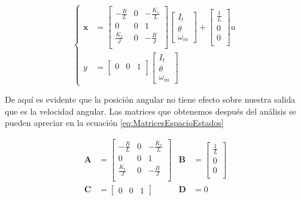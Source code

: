 \begin{equation}
  \begin{cases}
    \dot{\mathbf{x}}&=\begin{bmatrix}
     -\frac{R}{L}   & 0 & -\frac{K_e}{L} \\
      0             & 0 &   1            \\
      \frac{K_t}{J} & 0 & -\frac{B}{J}   \\
    \end{bmatrix}
    \begin{bmatrix}
      I_t\\ \theta\\ \omega_m
    \end{bmatrix}
    +\begin{bmatrix} 
      \frac{1}{L} \\
      0\\
      0\\
    \end{bmatrix} u\\
    y &= \begin{bmatrix}
      0 & 0 & 1\\
    \end{bmatrix}
    \begin{bmatrix}
      I_t\\ \theta\\ \omega_m
    \end{bmatrix}
  \end{cases}
\end{equation}

De aquí es evidente que la posición angular no tiene efecto sobre
nuestra salida que es la velocidad angular.
Las matrices que obtenemos después del análisis se pueden apreciar
en la ecuación \eqref{eq:MatricesEspacioEstados}

\begin{equation}
  \begin{aligned}
    \mathbf{A} &= \begin{bmatrix}
    -\frac{R}{L}  & 0 & -\frac{K_e}{L} \\
    0             & 0 &  1           \\
    \frac{K_t}{J} & 0 & -\frac{B}{J} \\
  \end{bmatrix} &
    \mathbf{B} &= \begin{bmatrix}
    \frac{1}{L} \\
    0\\
    0\\
  \end{bmatrix} \\
  \mathbf{C} &= \begin{bmatrix}
      0 & 0 & 1
    \end{bmatrix} &
    \mathbf{D} &= 0
 \end{aligned}
  \label{eq:MatricesEspacioEstados}
\end{equation}
